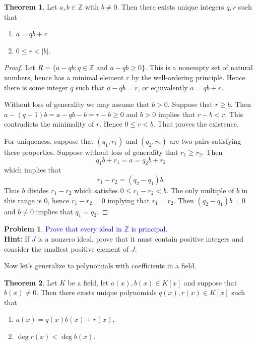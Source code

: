 \documentclass[11pt]{article}
\def\ZZ{\mathbb{Z}}
\theoremstyle{definition}
\newtheorem{theorem}{Theorem}[section]
\newtheorem{problem}{Problem}[section]
\numberwithin{equation}{subsection}
\newcommand{\blue}[1]{\textcolor{blue}{#1}}
\begin{document}
\begin{theorem}
    Let $a, b \in \ZZ$ with $b \neq 0$.
    Then there exists unique integers $q, r$ such that
    \begin{enumerate}
        \item $a = qb + r$\\
        \item $0 \leq r < |b|$.
    \end{enumerate}
\end{theorem}

\begin{proof}
    Let $R = \{a - qb : q \in \ZZ \text{ and } a - qb \geq 0\}$.
    This is a nonempty set of natural numbers, hence has a minimal element $r$ by the well-ordering principle.
    Hence there is some integer $q$ such that $a - qb = r$, or equivalently $a = qb + r$.
    
    Without loss of generality we may assume that $b > 0$.
    Suppose that $r \geq b$.
    Then $a - (q + 1)b = a -qb - b = r - b \geq 0$ and $b > 0$ implies that $r - b < r$.
    This contradicts the minimality of $r$.
    Hence $0 \leq r < b$.
    That proves the existence.

    For uniqueness, suppose that $(q_1, r_1)$ and $(q_2, r_2)$ are two pairs satisfying these properties.
    Suppose without loss of generality that $r_1 \geq r_2$.
    Then
    \[
        q_1 b + r_1 = a = q_2 b + r_2
    \]
    which implies that
    \[
        r_1 - r_2 = (q_2 - q_1)b.
    \]
    Thus $b$ divides $r_1 - r_2$ which satisfies $0 \leq r_1 - r_2 < b$.
    The only multiple of $b$ in this range is 0, hence $r_1 - r_2 = 0$ implying that $r_1 = r_2$.
    Then $(q_2 - q_1)b = 0$ and $b \neq 0$ implies that $q_1 = q_2$.
\end{proof}

\begin{problem}
    \blue{Prove that every ideal in $\ZZ$ is principal.}\\
    \textbf{Hint:} If $J$ is a nonzero ideal, prove that it must contain positive integers and consider the smallest positive element of $J$.
\end{problem}

Now let's generalize to polynomials with coefficients in a field.

\begin{theorem}
    Let $K$ be a field, let $a(x), b(x) \in K[x]$ and suppose that $b(x) \neq 0$.
    Then there exists unique polynomials $q(x), r(x) \in K[x]$ such that
    \begin{enumerate}
        \item $a(x) = q(x)b(x) + r(x)$,
        \item $\deg r(x) < \deg b(x)$.
    \end{enumerate}
\end{theorem}
\end{document}
